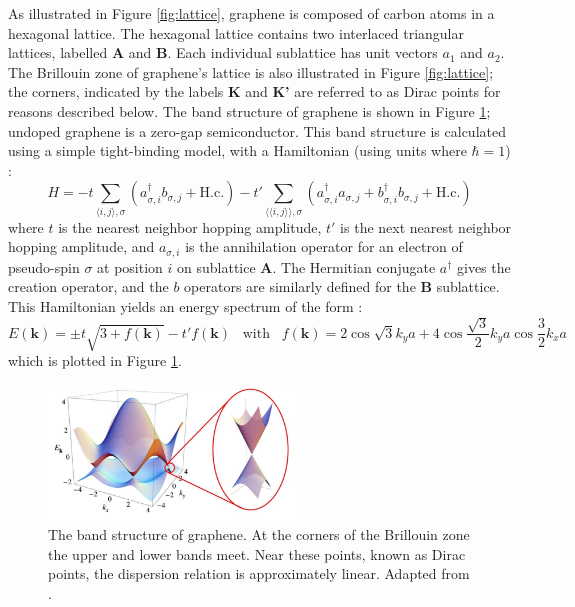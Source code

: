 \documentclass[edeposit,fullpage,draftthesis]{uiucthesis2009}
\begin{document}
        As illustrated in Figure \ref{fig:lattice}, graphene is composed of carbon atoms in a hexagonal lattice. The hexagonal lattice contains two interlaced triangular lattices, labelled \textbf{A} and \textbf{B}. Each individual sublattice has unit vectors $a_1$ and $a_2$. The Brillouin zone of graphene's lattice is also illustrated in Figure \ref{fig:lattice}; the corners, indicated by the labels \textbf{K} and \textbf{K'} are referred to as Dirac points for reasons described below. 
        The band structure of graphene is shown in Figure \ref{fig:bandstructure}; undoped graphene is a zero-gap semiconductor. This band structure is calculated using a simple tight-binding model, with a Hamiltonian (using units where $\hbar=1$) \cite{CastroNeto2009}:
        \begin{equation}
        H = - t \sum\limits_{\langle i,j\rangle,\sigma} (a_{\sigma,i}^\dagger b_{\sigma,j} + \text{H.c.})
        - t' \sum\limits_{\langle\langle i,j\rangle\rangle,\sigma} (a_{\sigma,i}^\dagger a_{\sigma,j} + b_{\sigma,i}^\dagger b_{\sigma,j} + \text{H.c.})
        \end{equation}
        where $t$ is the nearest neighbor hopping amplitude, $t'$ is the next nearest neighbor hopping amplitude, and $a_{\sigma,i}$ is the annihilation operator for an electron of pseudo-spin $\sigma$ at position $i$ on sublattice \textbf{A}. The Hermitian conjugate $a^\dagger$ gives the creation operator, and the $b$ operators are similarly defined for the \textbf{B} sublattice. This Hamiltonian yields an energy spectrum of the form \cite{CastroNeto2009}:
        \begin{equation}
        E(\mathbf{k}) = \pm t \sqrt{3 + f(\mathbf{k})} - t' f(\mathbf{k}) \;\;\; \text{with} \;\;\; f(\mathbf{k}) = 2 \cos{\sqrt{3} k_y a } + 4 \cos{\frac{\sqrt{3}}{2} k_y a} \cos{\frac{3}{2} k_x a}
        \end{equation} 
        which is plotted in Figure \ref{fig:bandstructure}.
    
        \begin{figure}
        \centering
        \includegraphics[width=0.6\textwidth]{images/background/ElecPropertiesFig3.png}
        \caption[The band structure of graphene]{The band structure of graphene. At the corners of the Brillouin zone the upper and lower bands meet. Near these points, known as Dirac points, the dispersion relation is approximately linear. Adapted from \cite{CastroNeto2009}.}
        \label{fig:bandstructure}
        \end{figure}
    
\end{document}
